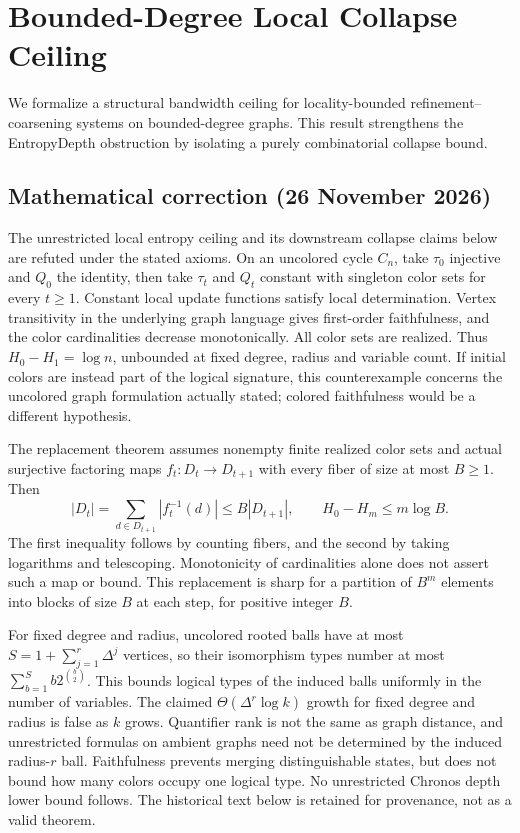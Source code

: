 \section{Bounded-Degree Local Collapse Ceiling}
\label{sec:bounded_degree_collapse}

We formalize a structural bandwidth ceiling for locality-bounded
refinement–coarsening systems on bounded-degree graphs.
This result strengthens the EntropyDepth obstruction
by isolating a purely combinatorial collapse bound.

\subsection*{Mathematical correction (26 November 2026)}
The unrestricted local entropy ceiling and its downstream collapse claims below are refuted under the stated axioms. On an uncolored cycle $C_n$, take $\tau_0$ injective and $Q_0$ the identity, then take $\tau_t$ and $Q_t$ constant with singleton color sets for every $t\ge1$. Constant local update functions satisfy local determination. Vertex transitivity in the underlying graph language gives first-order faithfulness, and the color cardinalities decrease monotonically. All color sets are realized. Thus $H_0-H_1=\log n$, unbounded at fixed degree, radius and variable count. If initial colors are instead part of the logical signature, this counterexample concerns the uncolored graph formulation actually stated; colored faithfulness would be a different hypothesis.

The replacement theorem assumes nonempty finite realized color sets and actual surjective factoring maps $f_t:D_t\to D_{t+1}$ with every fiber of size at most $B\ge1$. Then
\[
|D_t|=\sum_{d\in D_{t+1}}|f_t^{-1}(d)|\le B|D_{t+1}|,
\qquad H_0-H_m\le m\log B.
\]
The first inequality follows by counting fibers, and the second by taking logarithms and telescoping. Monotonicity of cardinalities alone does not assert such a map or bound. This replacement is sharp for a partition of $B^m$ elements into blocks of size $B$ at each step, for positive integer $B$.

For fixed degree and radius, uncolored rooted balls have at most $S=1+\sum_{j=1}^r\Delta^j$ vertices, so their isomorphism types number at most $\sum_{b=1}^S b2^{\binom b2}$. This bounds logical types of the induced balls uniformly in the number of variables. The claimed $\Theta(\Delta^r\log k)$ growth for fixed degree and radius is false as $k$ grows. Quantifier rank is not the same as graph distance, and unrestricted formulas on ambient graphs need not be determined by the induced radius-$r$ ball. Faithfulness prevents merging distinguishable states, but does not bound how many colors occupy one logical type. No unrestricted Chronos depth lower bound follows. The historical text below is retained for provenance, not as a valid theorem.

